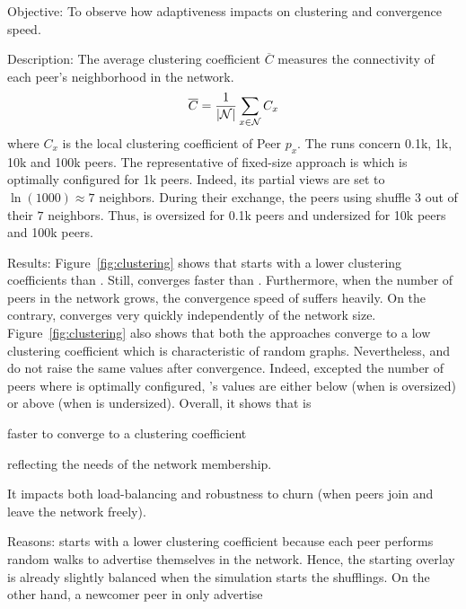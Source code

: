 \begin{asparadesc}
\item[Objective:] To observe how adaptiveness impacts on clustering and
  convergence speed.
\item[Description:] The average clustering coefficient $\overline{C}$ measures
  the connectivity of each peer's neighborhood in the network.
  \begin{equation}
    \overline{C} = {1\over |\mathcal{N}|}\sum\limits_{x\in\mathcal{N}}C_x
  \end{equation}
  where $C_x$ is the local clustering coefficient of Peer $p_x$.  The runs
  concern 0.1k, 1k, 10k and 100k peers. The representative of fixed-size
  approach is \CYCLON which is optimally configured for 1k peers. Indeed, its
  partial views are set to $\ln(1000)\approx 7$ neighbors. During their
  exchange, the peers using \CYCLON shuffle $3$ out of their $7$
  neighbors. Thus, \CYCLON is oversized for 0.1k peers and undersized for 10k
  peers and 100k peers.
\item[Results:] Figure~\ref{fig:clustering} shows that \CYCLON starts with a
  lower clustering coefficients than \SPRAY. Still, \SPRAY converges faster
  than \CYCLON. Furthermore, when the number of peers in the network grows, the
  convergence speed of \CYCLON suffers heavily. On the contrary, \SPRAY
  converges very quickly independently of the network
  size. Figure~\ref{fig:clustering} also shows that both the approaches
  converge to a low clustering coefficient which is characteristic of random
  graphs. Nevertheless, \CYCLON and \SPRAY do not raise the same values after
  convergence. Indeed, excepted the number of peers where \CYCLON is optimally
  configured, \SPRAY's values are either below (when \CYCLON is oversized) or
  above (when \CYCLON is undersized).  Overall, it shows that \SPRAY is
  \begin{inparaenum}
  \item faster to converge to a clustering coefficient
  \item reflecting the needs of the network membership.
  \end{inparaenum}
  It impacts both load-balancing and robustness to churn (when peers join and
  leave the network freely).
\item[Reasons:] \CYCLON starts with a lower clustering coefficient because each
  peer performs random walks to advertise themselves in the network. Hence, the
  starting overlay is already slightly balanced when the simulation starts the
  shufflings. On the other hand, a newcomer peer in \SPRAY only advertise

\end{asparadesc}

